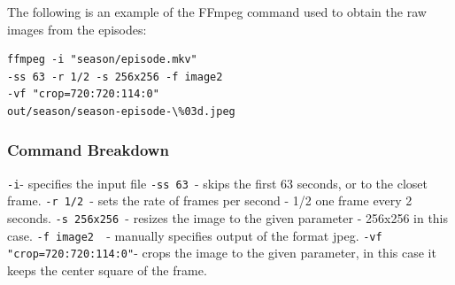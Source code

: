 \documentclass{article}
\begin{document}
\begin{multicols}{2}
{The following is an example of the FFmpeg \cite{noauthor_ffmpeg_nodate} command used to obtain the raw images from the episodes:

\vskip 0.1in
 \begin{verbatim}
ffmpeg -i "season/episode.mkv"
-ss 63 -r 1/2 -s 256x256 -f image2
-vf "crop=720:720:114:0"
out/season/season-episode-\%03d.jpeg
\end{verbatim}

\subsubsection{Command Breakdown}
\verb|-i|- specifies the input file \newline
\verb|-ss 63 |- skips the first 63 seconds, or to the closet frame.\newline
\verb|-r 1/2 |- sets the rate of frames per second - 1/2 one frame every 2 seconds. \newline
\verb|-s 256x256 |- resizes the image to the given parameter - 256x256 in this case.\newline
\verb|-f image2  |- manually specifies output of the format jpeg.\newline
\verb|-vf "crop=720:720:114:0"|- crops the image to the given parameter, in this case it keeps the center square of the frame. \newline

}


\end{multicols}
\end{document}

